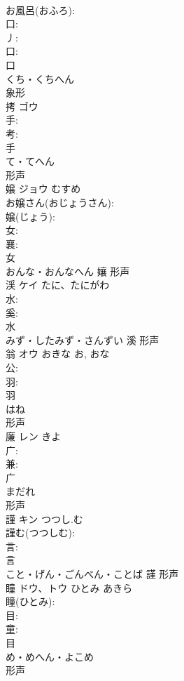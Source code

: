 \documentclass[8pt]{extreport}
\begin{document}
\begin{CJK}{UTF8}{min}
\\	お風呂(おふろ): 
\\	口: 
\\	丿: 
\\	口: 
\\	口	
\\	くち・くちへん	
\\	象形 
\\	拷	ゴウ			
\\	手: 
\\	考: 
\\	手	
\\	て・てへん	
\\	形声 
\\	嬢	ジョウ	むすめ		
\\	お嬢さん(おじょうさん): 
\\	嬢(じょう): 
\\	女: 
\\	襄: 
\\	女	
\\	おんな・おんなへん	孃	形声 
\\	渓	ケイ	たに、たにがわ		
\\	水: 
\\	奚: 
\\	水	
\\	みず・したみず・さんずい	溪	形声 
\\	翁	オウ	おきな	お, おな	
\\	公: 
\\	羽: 
\\	羽	
\\	はね	
\\	形声 
\\	廉	レン		きよ	
\\	广: 
\\	兼: 
\\	广	
\\	まだれ	
\\	形声 
\\	謹	キン	つつし.む		
\\	謹む(つつしむ): 
\\	言: 
\\	言	
\\	こと・げん・ごんべん・ことば	謹	形声 
\\	瞳	ドウ、トウ	ひとみ	あきら	
\\	瞳(ひとみ): 
\\	目: 
\\	童: 
\\	目	
\\	め・めへん・よこめ	
\\	形声 

\end{CJK}
\end{document}
